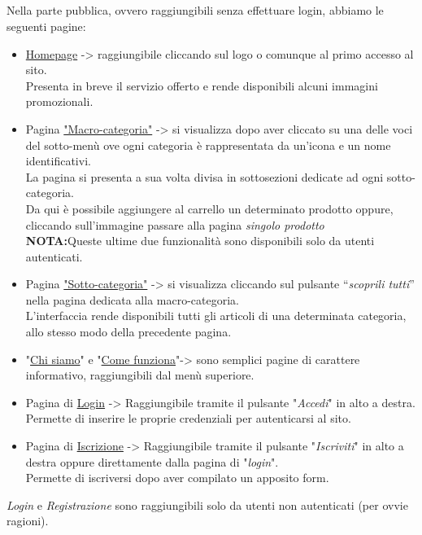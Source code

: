 \subsection{}
\subsection{}
\subsection{}
Nella parte pubblica, ovvero raggiungibili senza effettuare login, abbiamo le seguenti pagine:
\begin{itemize}
	\item \underline{Homepage} -> raggiungibile cliccando sul logo o comunque al primo accesso al sito.\\ Presenta in breve il servizio offerto e rende disponibili alcuni immagini promozionali.
	\item Pagina \underline{"Macro-categoria"} -> si visualizza dopo aver cliccato su una delle voci del sotto-menù ove ogni categoria è rappresentata da un’icona e un nome identificativi.\\ La pagina si presenta a sua volta divisa in sottosezioni dedicate ad ogni sotto-categoria.\\
	Da qui è possibile aggiungere al carrello un determinato prodotto oppure, cliccando sull'immagine passare alla pagina \textit{singolo prodotto}\\ \textbf{NOTA:}Queste ultime due funzionalità sono disponibili solo da utenti autenticati.
	\item Pagina \underline{"Sotto-categoria"} -> si visualizza cliccando sul pulsante “\textit{scoprili tutti}” nella pagina dedicata alla macro-categoria.\\L’interfaccia rende disponibili tutti gli articoli di una determinata categoria, allo stesso modo della precedente pagina.
	\item "\underline{Chi siamo}"  e "\underline{Come funziona}"-> sono semplici pagine di carattere informativo, raggiungibili dal menù superiore.
	\item Pagina di \underline{Login} -> Raggiungibile tramite il pulsante "\textit{Accedi}" in alto a destra.\\
	Permette di inserire le proprie credenziali per autenticarsi al sito.
	\item Pagina di \underline{Iscrizione} -> Raggiungibile tramite il pulsante "\textit{Iscriviti}" in alto a destra oppure direttamente dalla pagina di "\textit{login}".\\
	Permette di iscriversi dopo aver compilato un apposito form.
\end{itemize}
\textit{Login} e \textit{Registrazione} sono raggiungibili solo da utenti non autenticati (per ovvie ragioni).


